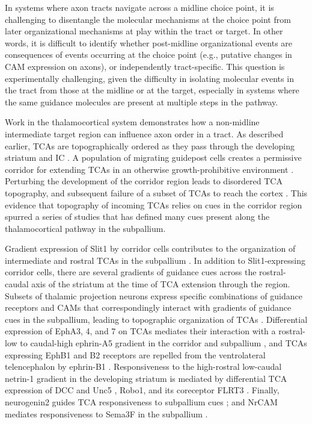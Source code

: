 In systems where axon tracts navigate across a midline choice point, it is challenging to disentangle the molecular mechanisms at the choice point from later organizational mechanisms at play within the tract or target.
In other words, it is difficult to identify whether post-midline organizational events are consequences of events occurring at the choice point (e.g., putative changes in CAM expression on axons), or independently tract-specific.
This question is experimentally challenging, given the difficulty in isolating molecular events in the tract from those at the midline or at the target, especially in systems where the same guidance molecules are present at multiple steps in the pathway. 

Work in the thalamocortical system demonstrates how a non-midline intermediate target region can influence axon order in a tract. 
As described earlier, TCAs are topographically ordered as they pass through the developing striatum and IC \cite{garel2014inputs}.
A population of migrating guidepost cells creates a permissive corridor for extending TCAs in an otherwise growth-prohibitive environment \cite{bielle2011emergent,lopez2006tangential}. 
Perturbing the development of the corridor region leads to disordered TCA topography, and subsequent failure of a subset of TCAs to reach the cortex \cite{garel2002early}. 
This evidence that topography of incoming TCAs relies on cues in the corridor region spurred a series of studies that has defined many cues present along the thalamocortical pathway in the subpallium. 

Gradient expression of Slit1 by corridor cells contributes to the organization of intermediate and rostral TCAs in the subpallium \cite{bielle2011emergent}. 
In addition to Slit1-expressing corridor cells, there are several gradients of guidance cues across the rostral-caudal axis of the striatum at the time of TCA extension through the region. 
Subsets of thalamic projection neurons express specific combinations of guidance receptors and CAMs that correspondingly interact with gradients of guidance cues in the subpallium, leading to topographic organization of TCAs \cite[reviewed in][]{garel2014inputs,molnar2012mechanisms}. 
Differential expression of EphA3, 4, and 7 on TCAs mediates their interaction with a rostral-low to caudal-high ephrin-A5 gradient in the corridor and subpallium \cite{dufour2003area}, and TCAs expressing EphB1 and B2 receptors are repelled from the ventrolateral telencephalon by ephrin-B1 \cite{robichaux2014ephb}.
Responsiveness to the high-rostral low-caudal netrin-1 gradient in the developing striatum is mediated by differential TCA expression of DCC and Unc5 \cite{powell2008topography}, Robo1, and its coreceptor FLRT3 \cite{leyva2014flrt3}.
Finally, neurogenin2 guides TCA responsiveness to subpallium cues \cite{seibt2003neurogenin2}; and NrCAM mediates responsiveness to Sema3F in the subpallium \cite{demyanenko2011nrcam}. 

